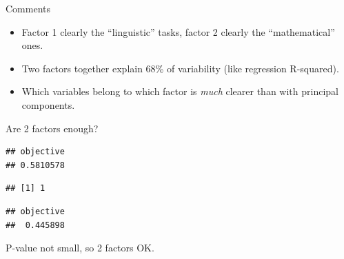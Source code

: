 \documentclass[ignorenonframetext,]{beamer}
\newenvironment{Shaded}{\begin{snugshade}}{\end{snugshade}}
\newcommand{\NormalTok}[1]{#1}
\newcommand{\OperatorTok}[1]{\textcolor[rgb]{0.81,0.36,0.00}{\textbf{#1}}}
\begin{document}
\begin{frame}{Comments}
\protect\hypertarget{comments-37}{}

\begin{itemize}
\item
  Factor 1 clearly the ``linguistic'' tasks, factor 2 clearly the
  ``mathematical'' ones.
\item
  Two factors together explain 68\% of variability (like regression
  R-squared).
\item
  Which variables belong to which factor is \emph{much} clearer than
  with principal components.
\end{itemize}

\end{frame}

\begin{frame}[fragile]{Are 2 factors enough?}
\protect\hypertarget{are-2-factors-enough}{}

\begin{Shaded}
\end{Shaded}

\begin{verbatim}
## objective 
## 0.5810578
\end{verbatim}

\begin{Shaded}
\end{Shaded}

\begin{verbatim}
## [1] 1
\end{verbatim}

\begin{Shaded}
\end{Shaded}

\begin{verbatim}
## objective 
##  0.445898
\end{verbatim}

P-value not small, so 2 factors OK.

\end{frame}
\end{document}

